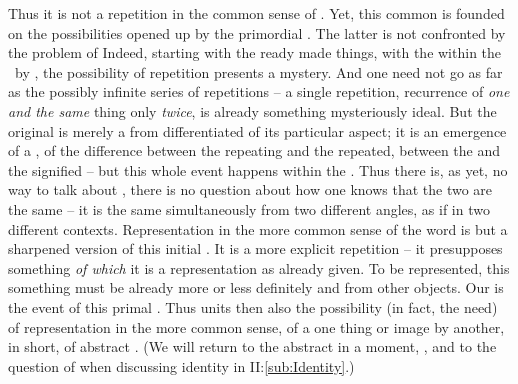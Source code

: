 Thus it is not a repetition in the common sense of . Yet, this common  is founded
  on the possibilities opened up by the 
primordial  . The latter is not confronted by the
problem of  Indeed, starting with the ready made things, with the 
 within the \hoa\ by , the possibility
of repetition presents a mystery. And one need not go as far as the possibly
infinite series of repetitions -- a single repetition, recurrence of {\em one
  and the same} thing only {\em twice}, is already something mysteriously ideal.
But the original  is merely a  from
differentiated  of its particular aspect; it is an emergence of a
, of the difference between the {repeating} and the
{repeated}, between the  and the signified -- but this whole event
happens within the \hoa. Thus there is, as yet, no way to talk about , there is no question about how one knows that the two are the same --
it is the same  simultaneously from two different angles, as if
in two different contexts.  Representation in the more common sense of the word
is but a sharpened version of this initial . It is a more
explicit repetition -- it presupposes something {\em of which} it is a
representation as already given. To be represented, this something must be
already more or less definitely and  from other
objects. Our  is the event of this primal .
Thus  units  then also the possibility (in
fact, the need) of representation in the more common sense, of a one
 thing or image by another, in short, of abstract .
(We will return to the abstract  in a moment, , 
and to the question of  when discussing identity in II:\ref{sub:Identity}.)



